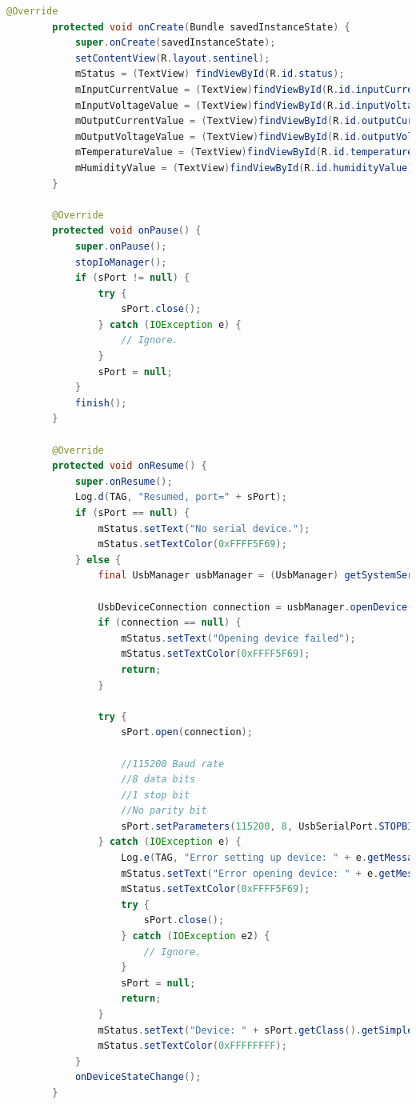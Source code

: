 \documentclass{article}
\numberwithin{figure}{section}
\numberwithin{equation}{section}
\begin{document}
{\begin{lstlisting}[language=Java,label=lst:sentlist,caption=SentinelActivity.java]
        @Override
        protected void onCreate(Bundle savedInstanceState) {
            super.onCreate(savedInstanceState);
            setContentView(R.layout.sentinel);
            mStatus = (TextView) findViewById(R.id.status);
            mInputCurrentValue = (TextView)findViewById(R.id.inputCurrentValue);
            mInputVoltageValue = (TextView)findViewById(R.id.inputVoltageValue);
            mOutputCurrentValue = (TextView)findViewById(R.id.outputCurrentValue);
            mOutputVoltageValue = (TextView)findViewById(R.id.outputVoltageValue);
            mTemperatureValue = (TextView)findViewById(R.id.temperatureValue);
            mHumidityValue = (TextView)findViewById(R.id.humidityValue);
        }

        @Override
        protected void onPause() {
            super.onPause();
            stopIoManager();
            if (sPort != null) {
                try {
                    sPort.close();
                } catch (IOException e) {
                    // Ignore.
                }
                sPort = null;
            }
            finish();
        }

        @Override
        protected void onResume() {
            super.onResume();
            Log.d(TAG, "Resumed, port=" + sPort);
            if (sPort == null) {
                mStatus.setText("No serial device.");
                mStatus.setTextColor(0xFFFF5F69);
            } else {
                final UsbManager usbManager = (UsbManager) getSystemService(Context.USB_SERVICE);

                UsbDeviceConnection connection = usbManager.openDevice(sPort.getDriver().getDevice());
                if (connection == null) {
                    mStatus.setText("Opening device failed");
                    mStatus.setTextColor(0xFFFF5F69);
                    return;
                }

                try {
                    sPort.open(connection);

                    //115200 Baud rate
                    //8 data bits
                    //1 stop bit
                    //No parity bit
                    sPort.setParameters(115200, 8, UsbSerialPort.STOPBITS_1, UsbSerialPort.PARITY_NONE);
                } catch (IOException e) {
                    Log.e(TAG, "Error setting up device: " + e.getMessage(), e);
                    mStatus.setText("Error opening device: " + e.getMessage());
                    mStatus.setTextColor(0xFFFF5F69);
                    try {
                        sPort.close();
                    } catch (IOException e2) {
                        // Ignore.
                    }
                    sPort = null;
                    return;
                }
                mStatus.setText("Device: " + sPort.getClass().getSimpleName());
                mStatus.setTextColor(0xFFFFFFFF);
            }
            onDeviceStateChange();
        }


\end{lstlisting}}
\end{document}
